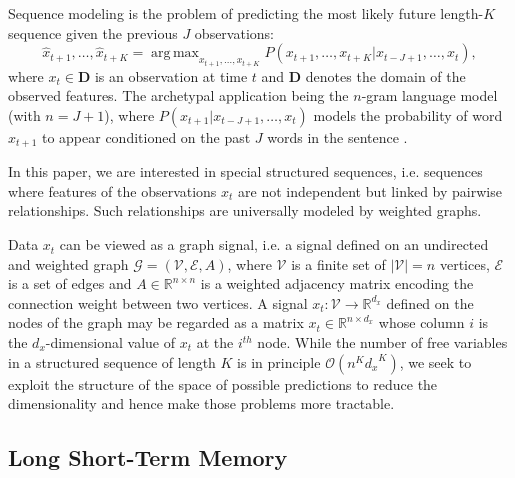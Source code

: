 \documentclass{article} %
\DeclareMathOperator*{\argmax}{arg\,max}
\newcommand{\R}{\mathbb{R}}
\newcommand{\bO}{\mathcal{O}}
\newcommand{\G}{\mathcal{G}}
\newcommand{\V}{\mathcal{V}}
\newcommand{\E}{\mathcal{E}}
\begin{document}
Sequence modeling is the problem of predicting the most likely future
length-$K$ sequence given the previous $J$ observations:
\begin{equation} \label{eqn:seq}
	\hat{x}_{t+1}, \ldots, \hat{x}_{t+K} =
	\argmax_{x_{t+1}, \ldots, x_{t+K}}
	P(x_{t+1}, \ldots, x_{t+K} | x_{t-J+1}, \ldots, x_t),
\end{equation}
where $x_t \in \mathbf{D}$ is an observation at time $t$ and $\mathbf{D}$
denotes the domain of the observed features. The archetypal application being
the $n$-gram language model (with $n = J+1$), where $P(x_{t+1} | x_{t-J+1},
\ldots, x_t)$ models the probability of word $x_{t+1}$ to appear conditioned on
the past $J$ words in the sentence \citep{seq_graves}.

In this paper, we are interested in special structured sequences, i.e. sequences where features of the observations $x_t$ are not independent but linked by pairwise relationships. Such relationships are universally modeled by weighted graphs. 

Data $x_t$ can be viewed as a graph signal, i.e.
a signal defined on an undirected and weighted graph $\G = (\V, \E, A)$, where
$\V$ is a finite set of $|\V| = n$ vertices, $\E$ is a set of edges and $A \in
\R^{n \times n}$ is a weighted adjacency matrix encoding the connection weight
between two vertices. A signal $x_t: \V \rightarrow \R^{d_x}$ defined on the
nodes of the graph may be regarded as a matrix $x_t \in \R^{n \times d_x}$
whose column $i$ is the $d_x$-dimensional value of $x_t$ at the $i^{th}$ node.
While the number of free variables in a structured sequence of length $K$ is in
principle $\bO(n^K {d_x}^K)$, we seek to exploit the structure of the space
of possible predictions to reduce the dimensionality and hence make those
problems more tractable.

\subsection{Long Short-Term Memory}

\end{document}
